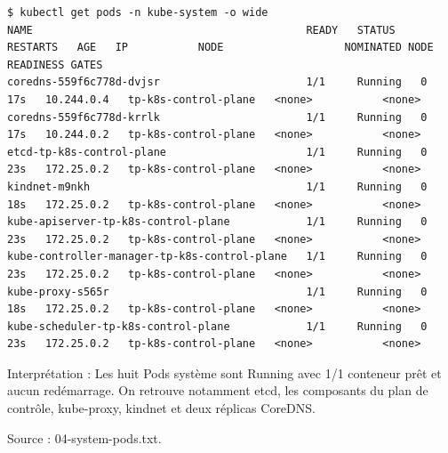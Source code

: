 \documentclass[11pt,a4paper]{article}
\begin{document}
\par\medskip\noindent\begin{minipage}{\linewidth}
\par\vspace{4pt}\noindent\begin{minipage}{\linewidth}
\begin{Verbatim}[breaklines=true,breakanywhere=true,fontsize=\footnotesize,frame=single,framesep=8pt,rulecolor=\color{teal}]
$ kubectl get pods -n kube-system -o wide
NAME                                           READY   STATUS    RESTARTS   AGE   IP           NODE                   NOMINATED NODE   READINESS GATES
coredns-559f6c778d-dvjsr                       1/1     Running   0          17s   10.244.0.4   tp-k8s-control-plane   <none>           <none>
coredns-559f6c778d-krrlk                       1/1     Running   0          17s   10.244.0.2   tp-k8s-control-plane   <none>           <none>
etcd-tp-k8s-control-plane                      1/1     Running   0          23s   172.25.0.2   tp-k8s-control-plane   <none>           <none>
kindnet-m9nkh                                  1/1     Running   0          18s   172.25.0.2   tp-k8s-control-plane   <none>           <none>
kube-apiserver-tp-k8s-control-plane            1/1     Running   0          23s   172.25.0.2   tp-k8s-control-plane   <none>           <none>
kube-controller-manager-tp-k8s-control-plane   1/1     Running   0          23s   172.25.0.2   tp-k8s-control-plane   <none>           <none>
kube-proxy-s565r                               1/1     Running   0          18s   172.25.0.2   tp-k8s-control-plane   <none>           <none>
kube-scheduler-tp-k8s-control-plane            1/1     Running   0          23s   172.25.0.2   tp-k8s-control-plane   <none>           <none>
\end{Verbatim}
\end{minipage}\par\vspace{6pt}

Interprétation : Les huit Pods système sont Running avec 1/1 conteneur prêt et aucun redémarrage. On retrouve notamment etcd, les composants du plan de contrôle, kube-proxy, kindnet et deux réplicas CoreDNS.

{\footnotesize\color{teal} Source : 04-system-pods.txt.\par}
\end{minipage}\par\medskip
\end{document}
